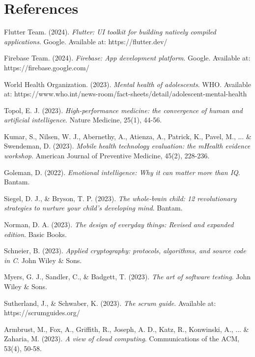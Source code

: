 ﻿\documentclass[12pt,a4paper]{article}
\newcommand{\chaptertitle}[1]{\section{#1}}
\begin{document}
\newpage

\chaptertitle{References}

\begin{thebibliography}{99}

Flutter Team. (2024). \textit{Flutter: UI toolkit for building natively compiled applications}. Google. Available at: https://flutter.dev/

Firebase Team. (2024). \textit{Firebase: App development platform}. Google. Available at: https://firebase.google.com/

World Health Organization. (2023). \textit{Mental health of adolescents}. WHO. Available at: https://www.who.int/news-room/fact-sheets/detail/adolescent-mental-health

Topol, E. J. (2023). \textit{High-performance medicine: the convergence of human and artificial intelligence}. Nature Medicine, 25(1), 44-56.

Kumar, S., Nilsen, W. J., Abernethy, A., Atienza, A., Patrick, K., Pavel, M., ... \& Swendeman, D. (2023). \textit{Mobile health technology evaluation: the mHealth evidence workshop}. American Journal of Preventive Medicine, 45(2), 228-236.

Goleman, D. (2022). \textit{Emotional intelligence: Why it can matter more than IQ}. Bantam.

Siegel, D. J., \& Bryson, T. P. (2023). \textit{The whole-brain child: 12 revolutionary strategies to nurture your child's developing mind}. Bantam.

Norman, D. A. (2023). \textit{The design of everyday things: Revised and expanded edition}. Basic Books.

Schneier, B. (2023). \textit{Applied cryptography: protocols, algorithms, and source code in C}. John Wiley \& Sons.

Myers, G. J., Sandler, C., \& Badgett, T. (2023). \textit{The art of software testing}. John Wiley \& Sons.

Sutherland, J., \& Schwaber, K. (2023). \textit{The scrum guide}. Available at: https://scrumguides.org/

Armbrust, M., Fox, A., Griffith, R., Joseph, A. D., Katz, R., Konwinski, A., ... \& Zaharia, M. (2023). \textit{A view of cloud computing}. Communications of the ACM, 53(4), 50-58.


\end{thebibliography}
\end{document}

